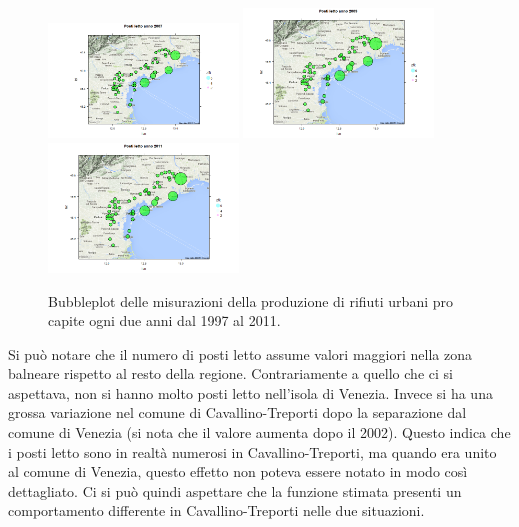 \documentclass[a4paper,11pt,twoside,openright]{book}							%
\begin{document}
\begin{figure}[H]
\includegraphics[trim=0cm 0cm 0cm 0cm,clip=true,width=0.45\textwidth]{Immagini/venezia_dati/PL2007.png}
\includegraphics[trim=0cm 0cm 0cm 0cm,clip=true,width=0.45\textwidth]{Immagini/venezia_dati/PL2009.png}
\includegraphics[trim=0cm 0cm 0cm 0cm,clip=true,width=0.45\textwidth]{Immagini/venezia_dati/PL2011.png}
\caption{Bubbleplot delle misurazioni della produzione di rifiuti urbani pro capite ogni due anni dal 1997 al 2011.}
\label{fig:Ven_bubblePL}
\end{figure}

\newpage
Si può notare che il numero di posti letto assume valori maggiori nella zona balneare rispetto al resto della regione. Contrariamente a quello che ci si aspettava, non si hanno molto posti letto nell'isola di Venezia. Invece si ha una grossa variazione nel comune di Cavallino-Treporti dopo la separazione dal comune di Venezia (si nota che il valore aumenta dopo il 2002). Questo indica che i posti letto sono in realtà numerosi in Cavallino-Treporti, ma quando era unito al comune di Venezia, questo effetto non poteva essere notato in modo così dettagliato. Ci si può quindi aspettare che la funzione stimata presenti un comportamento differente in Cavallino-Treporti nelle due situazioni.
\end{document}
